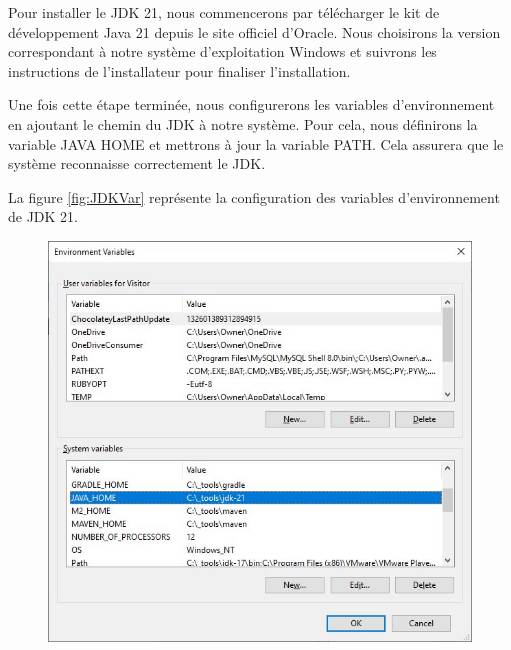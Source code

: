 \documentclass[12pt]{report}
\begin{document}
			\hspace{15pt} Pour installer le JDK 21, nous commencerons par télécharger le kit de développement Java 21 depuis le site officiel d'Oracle. Nous choisirons la version correspondant à notre système d'exploitation Windows et suivrons les instructions de l'installateur pour finaliser l'installation.

			Une fois cette étape terminée, nous configurerons les variables d'environnement en ajoutant le chemin du JDK à notre système. Pour cela, nous définirons la variable JAVA HOME et mettrons à jour la variable PATH. Cela assurera que le système reconnaisse correctement le JDK.

			La figure \ref{fig:JDKVar} représente la configuration des variables d'environnement de JDK 21.

			\begin{figure}[h]
			    \centering
			    \begin{minipage}[t]{0.48\textwidth}
			        \centering
			        \includegraphics[width=\textwidth]{JAVAHOME.jpg}
			    \end{minipage}\hfill
			    \begin{minipage}[t]{0.48\textwidth}
			        \centering

\end{minipage}
\end{figure}
\end{document}

